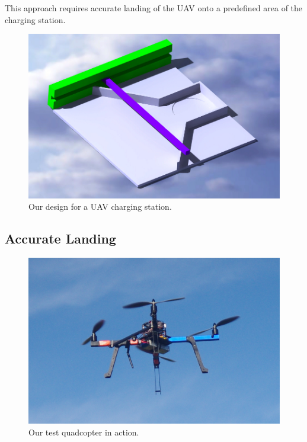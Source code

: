 \documentclass[10pt]{scrartcl} %
\begin{document}
This approach requires accurate landing of the UAV onto a predefined area of the charging station.

\begin{figure}[h]
    \centering
    \includegraphics[width=\textwidth]{images/catia.jpg}
    \caption{Our design for a UAV charging station.}
    \label{fig:catia}
\end{figure}


\subsection{Accurate Landing}




% 




\begin{figure}[h]
    \centering
    \includegraphics[width=\textwidth]{images/drone.jpg}
    \caption{Our test quadcopter in action.}
    \label{fig:drone}
\end{figure}
\end{document}
